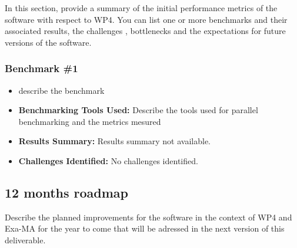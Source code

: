 In this section, provide a summary of the initial performance metrics of the software with respect to WP4.
You can list one or more benchmarks and their associated results, the challenges , bottlenecks and the expectations for future versions of the software.



\subsubsection{Benchmark \#1}
\begin{itemize}
    \item describe the benchmark
    \item \textbf{Benchmarking Tools Used:} Describe the tools used for parallel benchmarking and the metrics mesured
    \item \textbf{Results Summary:} Results summary not available.
    \item \textbf{Challenges Identified:} No challenges identified.
\end{itemize}

\subsection{12 months roadmap}
\label{sec:WP4:FreeFem++:roadmap}

Describe the planned improvements  for the software in the context of WP4 and Exa-MA for the year to come that will be adressed in the next version of this deliverable.